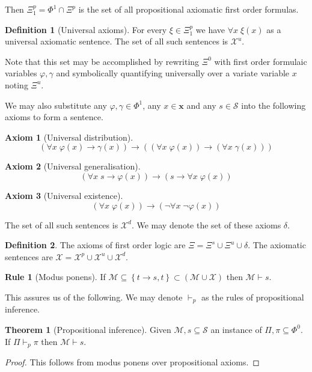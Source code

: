 \documentclass{amsbook}
\newcommand{\setsm}[1]{\left\{#1\right\}}
\newcommand{\infers}{\mathrel\vdash}
\newcommand{\univ}[1]{\mathord\forall#1\;}
\newcommand{\then}{\mathrel\rightarrow}
\theoremstyle{definition}
\newtheorem{axm}{Axiom}[chapter]
\newtheorem{frule}{Rule}[chapter]
\newtheorem{thm}{Theorem}[section]
\newtheorem{dfn}{Definition}[section]
\begin{document}
Then $\Xi^p_1 = \Phi^1 \cap \Xi^p$ is the set of all propositional axiomatic first order formulas.

\begin{dfn}[Universal axioms]
    For every $\xi \in \Xi^p_1$ we have $\univ x \xi(x)$ as a universal axiomatic sentence. The set of all such sentences is $\mathcal X^u$.

    Note that this set may be accomplished by rewriting $\Xi^0$ with first order formulaic variables $\varphi, \gamma$ and symbolically quantifying universally over a variate variable $x$ noting $\Xi^u$.
\end{dfn}

We may also substitute any $\varphi, \gamma \in \Phi^1$, any $x \in \mathbf x$ and any $s \in \mathcal S$ into the following axioms to form a sentence.

\begin{axm}[Universal distribution]
    $$\left( \univ x \varphi(x) \then \gamma(x) \right) \then \left(\left( \univ x \varphi(x) \right)  \then \left( \univ x \gamma(x) \right) \right)$$
\end{axm}

\begin{axm}[Universal generalisation]
    $$\left( \univ x s \then \varphi(x) \right) \then \left( s \then \univ x \varphi(x) \right)$$
\end{axm}

\begin{axm}[Universal existence]
    $$\left( \univ x \varphi(x) \right) \then \left( \neg \univ x \neg\varphi(x) \right)$$
\end{axm}

The set of all such sentences is $\mathcal X^d$. We may denote the set of these axioms $\delta$.

\begin{dfn}
    The axioms of first order logic are $\Xi = \Xi^s \cup \Xi^u \cup \delta$. The axiomatic sentences are $\mathcal X = \mathcal X^p \cup \mathcal X^u \cup \mathcal X^d$.
\end{dfn}

\begin{frule}[Modus ponens]
    If $\mathcal M \subseteq \setsm {t \then s, t} \subset (\mathcal M \cup \mathcal X)$ then $\mathcal M \infers s$.
\end{frule}

This assures us of the following. We may denote $\infers_p$ as the rules of propositional inference.

\begin{thm}[Propositional inference]
    Given $\mathcal M, s \subseteq \mathcal S$ an instance of $\Pi, \pi \subseteq \Phi^0$. If $\Pi \infers_p \pi$ then $\mathcal M \infers s$.
    \begin{proof}
        This follows from modus ponens over propositional axioms.
    \end{proof}
\end{thm}
\end{document}
